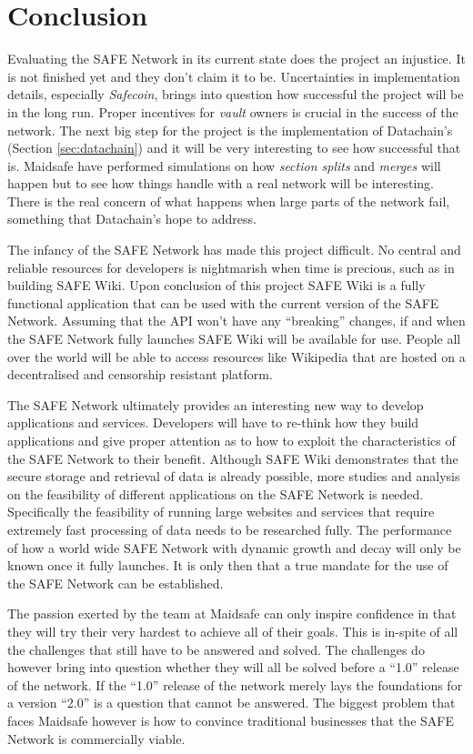 \chapter{Conclusion}

Evaluating the SAFE Network in its current state does the project an injustice. It is not finished yet and they don't claim it to be. Uncertainties in implementation details, especially \textit{Safecoin}, brings into question how successful the project will be in the long run. Proper incentives for \textit{vault} owners is crucial in the success of the network. The next big step for the project is the implementation of Datachain's (Section \ref{sec:datachain}) and it will be very interesting to see how successful that is. Maidsafe have performed simulations on how \textit{section splits} and \textit{merges} will happen but to see how things handle with a real network will be interesting. There is the real concern of what happens when large parts of the network fail, something that Datachain's hope to address.

The infancy of the SAFE Network has made this project difficult. No central and reliable resources for developers is nightmarish when time is precious, such as in building SAFE Wiki. Upon conclusion of this project SAFE Wiki is a fully functional application that can be used with the current version of the SAFE Network. Assuming that the API won't have any ``breaking'' changes, if and when the SAFE Network fully launches SAFE Wiki will be available for use. People all over the world will be able to access resources like Wikipedia that are hosted on a decentralised and censorship resistant platform.

The SAFE Network ultimately provides an interesting new way to develop applications and services. Developers will have to re-think how they build applications and give proper attention as to how to exploit the characteristics of the SAFE Network to their benefit. Although SAFE Wiki demonstrates that the secure storage and retrieval of data is already possible, more studies and analysis on the feasibility of different applications on the  SAFE Network is needed. Specifically the feasibility of running large websites and services that require extremely fast processing of data needs to be researched fully. The performance of how a world wide SAFE Network with dynamic growth and decay will only be known once it fully launches. It is only then that a true mandate for the use of the SAFE Network can be established. 

The passion exerted by the team at Maidsafe can only inspire confidence in that they will try their very hardest to achieve all of their goals. This is in-spite of all the challenges that still have to be answered and solved. The challenges do however bring into question whether they will all be solved before a ``1.0'' release of the network. If the ``1.0'' release of the network merely lays the foundations for a version ``2.0'' is a question that cannot be answered. The biggest problem that faces Maidsafe however is how to convince traditional businesses that the SAFE Network is commercially viable.

